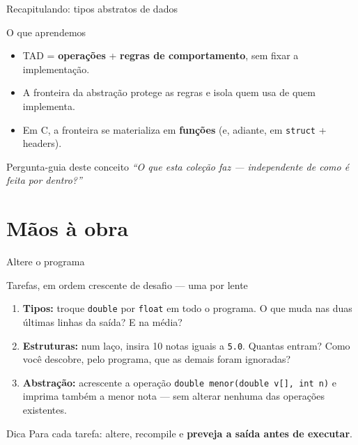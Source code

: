 \documentclass[aspectratio=169]{beamer}
\begin{document}
\begin{frame}{Recapitulando: tipos abstratos de dados}
  \begin{block}{O que aprendemos}
    \begin{itemize}
      \item TAD = \textbf{operações} + \textbf{regras de comportamento}, sem
        fixar a implementação.
      \item A fronteira da abstração protege as regras e isola quem usa de
        quem implementa.
      \item Em C, a fronteira se materializa em \textbf{funções} (e, adiante,
        em \texttt{struct} + headers).
    \end{itemize}
  \end{block}
  \begin{exampleblock}{Pergunta-guia deste conceito}
    \emph{``O que esta coleção faz --- independente de como é feita por
    dentro?''}
  \end{exampleblock}
\end{frame}

\section{Mãos à obra}

\begin{frame}[shrink=8]{Altere o programa}
  \begin{block}{Tarefas, em ordem crescente de desafio --- uma por lente}
    \begin{enumerate}
      \item \textbf{Tipos:} troque \texttt{double} por \texttt{float} em todo
        o programa. O que muda nas duas últimas linhas da saída? E na média?
      \item \textbf{Estruturas:} num laço, insira 10 notas iguais a
        \texttt{5.0}. Quantas entram? Como você descobre, pelo programa, que
        as demais foram ignoradas?
      \item \textbf{Abstração:} acrescente a operação
        \texttt{double menor(double v[], int n)} e imprima também a menor
        nota --- sem alterar nenhuma das operações existentes.
    \end{enumerate}
  \end{block}
  \begin{exampleblock}{Dica}
    Para cada tarefa: altere, recompile e \textbf{preveja a saída antes de
    executar}.
  \end{exampleblock}
\end{frame}
\end{document}
